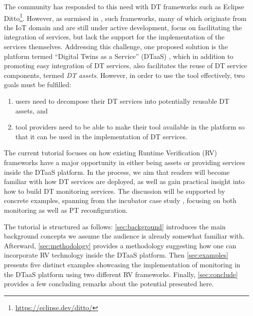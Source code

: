 The community has responded to this need with DT frameworks such as Eclipse Ditto\footnote{\url{https://eclipse.dev/ditto/}}.
However, as surmised in \cite{Gil2024}, such frameworks, many of which
originate from the IoT domain and are still under active development, focus on facilitating the integration of services, but lack the support for the implementation of the services themselves.
Addressing this challenge, one proposed solution is the platform termed ``Digital Twins as a Service'' (DTaaS) \cite{Talasila&23}, which in addition to promoting easy integration of DT services, also facilitates the reuse of DT service components, termed \emph{DT assets}.
However, in order to use the tool effectively, two goals must be fulfilled: 
\begin{enumerate}
    \item users need to decompose their DT services into potentially reusable DT assets, and 
    \item tool providers need to be able to make their tool available in the platform so that it can be used in the implementation of DT services.
\end{enumerate}%
%
The current tutorial focuses on how existing Runtime Verification (RV) frameworks have a major opportunity in either being assets or providing services inside the DTaaS platform. In the process, we aim that readers will become familiar with how DT services are deployed, as well as gain practical insight into how to build DT monitoring services.
The discussion will be supported by concrete examples, spanning from the incubator case study \cite{Feng2021,Feng2022}, focusing on both monitoring as well as PT reconfiguration. 


The tutorial is structured as follows: \cref{sec:background}  introduces the main background concepts we assume the audience is already somewhat familiar with. Afterward, \cref{sec:methodology} provides a methodology suggesting how one can incorporate RV technology inside the DTaaS platform. Then \cref{sec:examples} presents five distinct examples showcasing the implementation of monitoring in the DTaaS platform using two different RV frameworks. Finally, \cref{sec:conclude} provides a few concluding remarks about the potential presented here.

